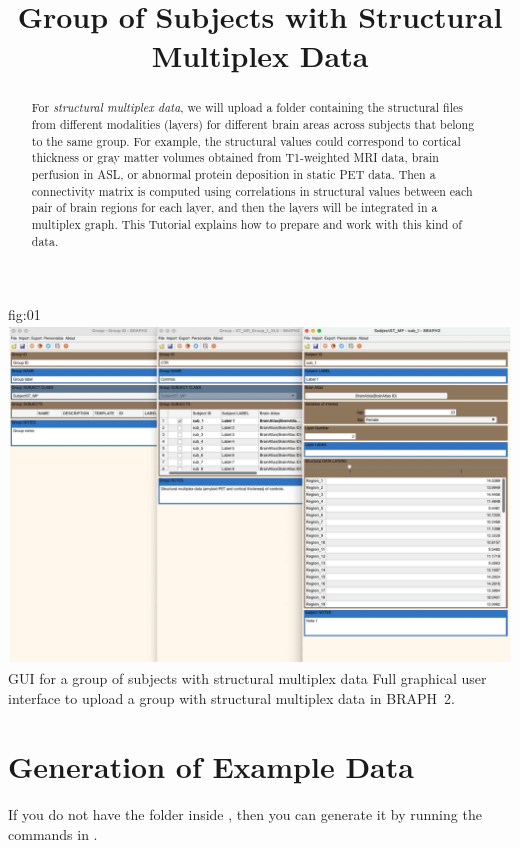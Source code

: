 \documentclass[justified]{tufte-handout}
\title{Group of Subjects with Structural Multiplex Data}
\begin{document}
\maketitle

\begin{abstract}
\noindent
For \emph{structural multiplex data}, we will upload a folder containing the structural files from different modalities (layers) for different brain areas across subjects that belong to the same group. For example, the structural values could correspond to cortical thickness or gray matter volumes obtained from T1-weighted MRI data, brain perfusion in ASL, or abnormal protein deposition in static PET data. Then a connectivity matrix is computed using correlations in structural values between each pair of brain regions for each layer, and then the layers will be integrated in a multiplex graph. This Tutorial explains how to prepare and work with this kind of data.
\end{abstract}


\tableofcontents

	{fig:01}
	{\includegraphics{fig01.jpg}}
	{GUI for a group of subjects with structural multiplex data}
	{
	Full graphical user interface to upload a group with structural multiplex data in BRAPH~2. 
	}

\clearpage
\section{Generation of Example Data}

If you do not have the  folder inside , then you can generate it by running the commands in .
\end{document}
